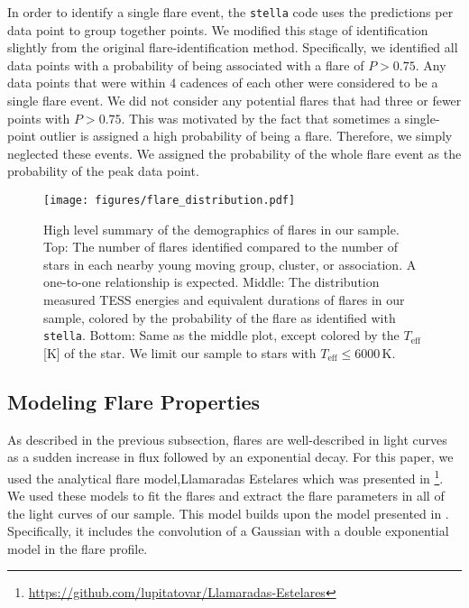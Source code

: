 \documentclass[twocolumn]{aastex631}
\begin{document}
In order to identify a single flare event, the \texttt{stella} code uses the
predictions per data point to group together points. We modified this stage of identification slightly from the original flare-identification method. Specifically, we identified all data points with a probability of being associated with a flare of $P > 0.75$. Any data points that were within 4 cadences of each other were considered to be a single flare event. We did not consider any potential flares that had three or fewer points with $P > 0.75$. This was motivated by the fact that  sometimes a single-point outlier is assigned a high probability of being a flare. Therefore, we simply neglected these events. We assigned the probability of the whole flare event as the probability of the peak data point.


\begin{figure}[ht!]
    \begin{centering}
        \texttt{[image: figures/flare\_distribution.pdf]}
        \caption{
            High level summary of the demographics of flares in our sample. Top:
            The number of flares identified compared to the number of stars in
            each nearby young moving group, cluster, or association. A one-to-one
            relationship is expected. Middle: The distribution measured TESS energies
            and equivalent durations of flares in our sample, colored by the probability
            of the flare as identified with \texttt{stella}. Bottom: Same as the
            middle plot, except colored by the $T_\textrm{eff}$ [K] of the star.
            We limit our sample to stars with $T_\textrm{eff} \leq 6000$\,K.
        }
        \label{fig:flare_distribution}
    \end{centering}
\end{figure}


\subsection{Modeling Flare Properties}\label{subsec2:model}

As described in the previous subsection, flares are well-described in light curves as a sudden increase in flux followed by an exponential decay. For this paper, we used the analytical flare model,Llamaradas Estelares which was  presented in
\cite{tovar22}\footnote{\url{https://github.com/lupitatovar/Llamaradas-Estelares}}. We used these models to fit the flares and extract the flare parameters in all of the light curves of our sample. This model builds upon the model presented
in \cite{davenport14}. Specifically, it includes the convolution of a Gaussian with a
double exponential model in the flare profile.
\end{document}
